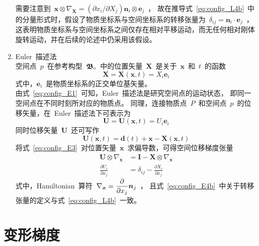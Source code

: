 \begin{enumerate}
需要注意到~$\bm{x} \otimes \nabla_{\bm{X}}=(\partial x_i \big/ \partial X_j)\bm{n}_i \otimes \bm{e}_j$~，
故在推导式~\eqref{eq:config_L4b}~中的分量形式时，假设了物质坐标系与空间坐标系的转移张量为~$\delta_{ij}=\bm{n}_i \cdot \bm{e}_j$~，
这表明物质坐标系与空间坐标系之间仅存在相对平移运动，而无任何相对刚体旋转运动，并在后续的论述中仍采用该假设。
\item Euler~描述法\\
空间点~$p$~在参考构型~$\bm{\mathfrak{B}}_{\scriptscriptstyle 0}$~中的位置矢量~$\bm{X}$~是关于~$\bm{x}$~和~$t$~的函数
\begin{equation}\label{eq:config_E1}
	\bm{X}=\bm{X}(\bm{x},t)=X_i\bm{e}_i
\end{equation}
式中，$\bm{e}_i$~是物质坐标系的正交单位基矢量。\\
由式~\eqref{eq:config_E1}~可知，Euler~描述法是研究空间点的运动状态，
即同一空间点在不同时刻所对应的物质点。
同理，连接物质点~$P$~和空间点~$p$~的位移矢量，在~Euler~描述法下可表示为
\begin{equation}\label{eq:config_E2}
	\bm{U}=\bm{U}(\bm{x},t)=U_i\bm{e}_i
\end{equation}
同时位移矢量~$\bm{U}$~还可写作
\begin{equation}\label{eq:config_E3}
	\bm{U}(\bm{x},t)=\bm{d}(t)+\bm{x}-\bm{X}(\bm{x},t)
\end{equation}
将式~\eqref{eq:config_E3}~对位置矢量~$\bm{x}$~求偏导数，可得空间位移梯度张量
{\setlength\belowdisplayskip{5pt}
\begin{subequations}\label{eq:config_E4}
	\begin{align}
	\bm{U} \otimes \nabla_{\bm{x}} & =\bm{I}-\bm{X} \otimes \nabla_{\bm{x}} \label{eq:config_E4a} \\[1pt]
	\frac{\partial U_i}{\partial x_j} & =\delta_{ij}-\frac{\partial X_i}{\partial x_j} \label{eq:config_E4b}
	\end{align}
\end{subequations}}
式中，Hamiltonian~算符~$\nabla_{\bm{x}}={\displaystyle\frac{\partial}{\partial x_j}} \bm{n}_j$~，
且式~\eqref{eq:config_E4b}~中关于转移张量的定义与式~\eqref{eq:config_L4b}~一致。
\end{enumerate}

\section{变形梯度}
